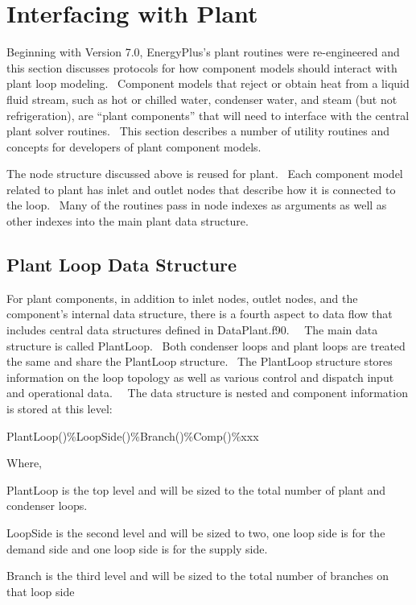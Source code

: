 \section{Interfacing with Plant}\label{interfacing-with-plant}

Beginning with Version 7.0, EnergyPlus's plant routines were re-engineered and this section discusses protocols for how component models should interact with plant loop modeling.~ Component models that reject or obtain heat from a liquid fluid stream, such as hot or chilled water, condenser water, and steam (but not refrigeration), are ``plant components'' that will need to interface with the central plant solver routines.~ This section describes a number of utility routines and concepts for developers of plant component models.

The node structure discussed above is reused for plant.~ Each component model related to plant has inlet and outlet nodes that describe how it is connected to the loop.~ Many of the routines pass in node indexes as arguments as well as other indexes into the main plant data structure.

\subsection{Plant Loop Data Structure}\label{plant-loop-data-structure}

For plant components, in addition to inlet nodes, outlet nodes, and the component's internal data structure, there is a fourth aspect to data flow that includes central data structures defined in DataPlant.f90.~~ The main data structure is called PlantLoop.~ Both condenser loops and plant loops are treated the same and share the PlantLoop structure.~ The PlantLoop structure stores information on the loop topology as well as various control and dispatch input and operational data.~~ The data structure is nested and component information is stored at this level:

PlantLoop()\%LoopSide()\%Branch()\%Comp()\%xxx

Where,

PlantLoop is the top level and will be sized to the total number of plant and condenser loops.

LoopSide is the second level and will be sized to two, one loop side is for the demand side and one loop side is for the supply side.

Branch is the third level and will be sized to the total number of branches on that loop side

